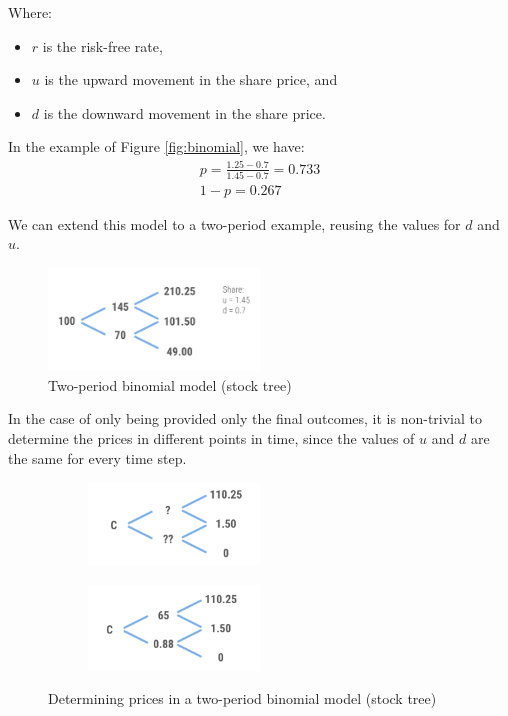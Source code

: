 Where:
\begin{itemize}
    \item \( r \) is the risk-free rate,
    \item \( u \) is the upward movement in the share price, and
    \item \( d \) is the downward movement in the share price.
\end{itemize}

In the example of Figure \ref{fig:binomial}, we have:
\begin{align}
    p=\frac{1.25-0.7}{1.45-0.7}=0.733\\
    1-p = 0.267
\end{align}

We can extend this model to a two-period example, reusing the values for $d$ and $u$.
\begin{figure}[H]
    \centering
    \includegraphics[width=0.5\textwidth]{img/9.4.2.png}
    \caption{Two-period binomial model (stock tree)}
    \label{fig:two-period}  
\end{figure}

In the case of only being provided only the final outcomes, it is non-trivial to determine the prices in different points in time, since the values of $u$ and $d$ are the same for every time step.

\begin{figure}[H]
    \centering
    \begin{subfigure}{0.48\textwidth}
        \centering
        \includegraphics[width=0.5\textwidth]{img/9.4.3.png}
    \end{subfigure}
    \begin{subfigure}{0.48\textwidth}
        \centering
        \includegraphics[width=0.5\textwidth]{img/9.4.4.png}
    \end{subfigure}
    \caption{Determining prices in a two-period binomial model (stock tree)}
\end{figure}

